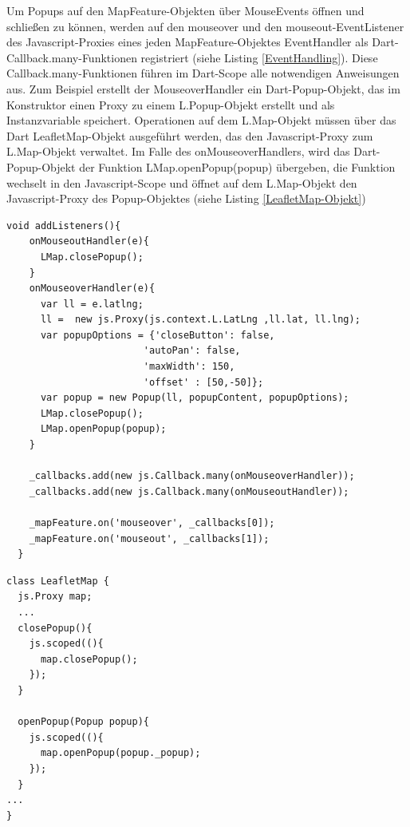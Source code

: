 Um Popups auf den MapFeature-Objekten über MouseEvents öffnen und schließen zu können, werden auf den mouseover und den mouseout-EventListener des Javascript-Proxies eines jeden MapFeature-Objektes EventHandler als Dart-Callback.many-Funktionen registriert (siehe Listing \ref{EventHandling}). Diese Callback.many-Funktionen führen im Dart-Scope alle notwendigen Anweisungen aus. Zum Beispiel erstellt der MouseoverHandler ein Dart-Popup-Objekt, das im Konstruktor einen Proxy zu einem L.Popup-Objekt erstellt und als Instanzvariable speichert. Operationen auf dem L.Map-Objekt müssen über das Dart LeafletMap-Objekt ausgeführt werden, das den Javascript-Proxy zum L.Map-Objekt verwaltet. Im Falle des onMouseoverHandlers, wird das Dart-Popup-Objekt der Funktion LMap.openPopup(popup) übergeben, die Funktion wechselt in den Javascript-Scope und öffnet auf dem L.Map-Objekt den Javascript-Proxy des Popup-Objektes (siehe Listing \ref{LeafletMap-Objekt})
\\
\begin{lstlisting}[caption=EventHandling mithilfe von Callback-Funktionen, label= EventHandling]
void addListeners(){
    onMouseoutHandler(e){
      LMap.closePopup();
    }
    onMouseoverHandler(e){
      var ll = e.latlng;
      ll =  new js.Proxy(js.context.L.LatLng ,ll.lat, ll.lng);
      var popupOptions = {'closeButton': false,
                        'autoPan': false,
                        'maxWidth': 150, 
                        'offset' : [50,-50]};
      var popup = new Popup(ll, popupContent, popupOptions);
      LMap.closePopup();
      LMap.openPopup(popup);
    }
    
    _callbacks.add(new js.Callback.many(onMouseoverHandler));
    _callbacks.add(new js.Callback.many(onMouseoutHandler));
    
    _mapFeature.on('mouseover', _callbacks[0]);
    _mapFeature.on('mouseout', _callbacks[1]);
  }
  \end{lstlisting}
  \begin{lstlisting}[caption=Zugriff auf das L.Map-Objekt (im Javascript-Scope) über das LeafletMap-Objekt (im Dart-Scope) in LeafletMap.dart, label= LeafletMap-Objekt]
class LeafletMap {
  js.Proxy map;
  ...
  closePopup(){
    js.scoped((){
      map.closePopup();
    });
  }

  openPopup(Popup popup){
    js.scoped((){
      map.openPopup(popup._popup);
    });
  }
...
}  
  \end{lstlisting}